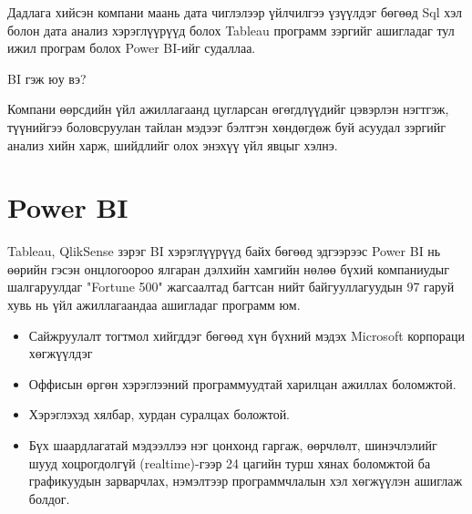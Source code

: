 \hspace{1in}Дадлага хийсэн компани маань дата чиглэлээр үйлчилгээ үзүүлдэг бөгөөд Sql хэл болон дата анализ хэрэглүүрүүд болох Tableau программ зэргийг ашигладаг тул ижил програм болох Power BI-ийг судаллаа.

BI гэж юу вэ?

    Компани өөрсдийн үйл ажиллагаанд цугларсан өгөгдлүүдийг цэвэрлэн нэгтгэж, түүнийгээ боловсруулан тайлан мэдээг бэлтгэн хөндөгдөж буй асуудал зэргийг анализ хийн харж, шийдлийг олох энэхүү үйл явцыг хэлнэ.

\section{Power BI}
Tableau, QlikSense зэрэг BI хэрэглүүрүүд байх бөгөөд эдгээрээс Power BI нь өөрийн гэсэн онцлогоороо ялгаран дэлхийн хамгийн нөлөө бүхий компаниудыг шалгаруулдаг "Fortune 500" жагсаалтад багтсан нийт байгууллагуудын 97 гаруй хувь нь үйл ажиллагаандаа ашигладаг программ юм.


\begin{itemize}
    \item Сайжруулалт тогтмол хийгддэг бөгөөд хүн бүхний мэдэх Microsoft корпораци хөгжүүлдэг
    \item Оффисын өргөн хэрэглээний программуудтай харилцан ажиллах боломжтой.
    \item Хэрэглэхэд хялбар, хурдан суралцах боложтой.
    \item Бүх шаардлагатай мэдээллээ нэг цонхонд гаргаж, өөрчлөлт, шинэчлэлийг шууд хоцрогдолгүй (realtime)-гээр 24 цагийн турш хянах боломжтой ба графикуудын зарварчлах, нэмэлтээр программчлалын хэл хөгжүүлэн ашиглаж болдог.
 \end{itemize}